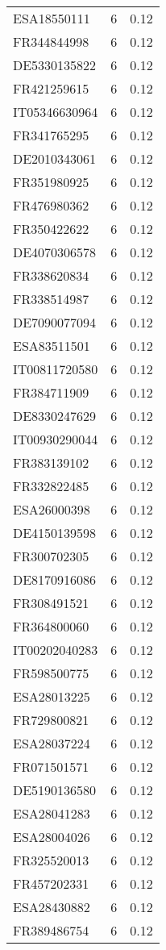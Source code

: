 \begin{table*}[htbp]
\begin{tabular}{lrr}
ESA18550111 & 6 & 0.12 \\
FR344844998 & 6 & 0.12 \\
DE5330135822 & 6 & 0.12 \\
FR421259615 & 6 & 0.12 \\
IT05346630964 & 6 & 0.12 \\
FR341765295 & 6 & 0.12 \\
DE2010343061 & 6 & 0.12 \\
FR351980925 & 6 & 0.12 \\
FR476980362 & 6 & 0.12 \\
FR350422622 & 6 & 0.12 \\
DE4070306578 & 6 & 0.12 \\
FR338620834 & 6 & 0.12 \\
FR338514987 & 6 & 0.12 \\
DE7090077094 & 6 & 0.12 \\
ESA83511501 & 6 & 0.12 \\
IT00811720580 & 6 & 0.12 \\
FR384711909 & 6 & 0.12 \\
DE8330247629 & 6 & 0.12 \\
IT00930290044 & 6 & 0.12 \\
FR383139102 & 6 & 0.12 \\
FR332822485 & 6 & 0.12 \\
ESA26000398 & 6 & 0.12 \\
DE4150139598 & 6 & 0.12 \\
FR300702305 & 6 & 0.12 \\
DE8170916086 & 6 & 0.12 \\
FR308491521 & 6 & 0.12 \\
FR364800060 & 6 & 0.12 \\
IT00202040283 & 6 & 0.12 \\
FR598500775 & 6 & 0.12 \\
ESA28013225 & 6 & 0.12 \\
FR729800821 & 6 & 0.12 \\
ESA28037224 & 6 & 0.12 \\
FR071501571 & 6 & 0.12 \\
DE5190136580 & 6 & 0.12 \\
ESA28041283 & 6 & 0.12 \\
ESA28004026 & 6 & 0.12 \\
FR325520013 & 6 & 0.12 \\
FR457202331 & 6 & 0.12 \\
ESA28430882 & 6 & 0.12 \\
FR389486754 & 6 & 0.12 \\

\end{tabular}
\end{table*}
